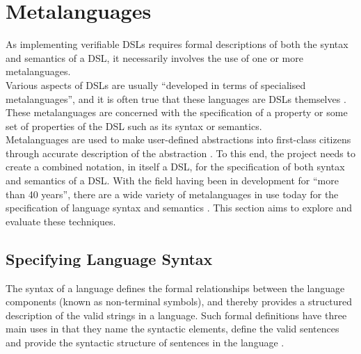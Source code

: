 \section{Metalanguages} %
\label{sec:metalanguages}

As implementing verifiable DSLs requires formal descriptions of both the syntax and semantics of a DSL, it necessarily involves the use of one or more metalanguages. \\

Various aspects of DSLs are usually ``developed in terms of specialised metalanguages'', and it is often true that these languages are DSLs themselves \citep{Mernik:2005:DDL:1118890.1118892}.
These metalanguages are concerned with the specification of a property or some set of properties of the DSL such as its syntax or semantics. \\

Metalanguages are used to make user-defined abstractions into first-class citizens through accurate description of the abstraction \citep{Siek:2010:GPL:1706356.1706358}.
To this end, the project needs to create a combined notation, in itself a DSL, for the specification of both syntax and semantics of a DSL. 
With the field having been in development for ``more than 40 years'', there are a wide variety of metalanguages in use today for the specification of language syntax and semantics \citep{Zhang:2004:SSD:981009.981013}. 
This section aims to explore and evaluate these techniques. 

\subsection{Specifying Language Syntax} %
\label{sub:specifying_language_syntax}
The syntax of a language defines the formal relationships between the language components (known as non-terminal symbols), and thereby provides a structured description of the valid strings in a language. 
Such formal definitions have three main uses in that they name the syntactic elements, define the valid sentences and provide the syntactic structure of sentences in the language \citep{Scowen:1982:SSM:947912.947917,standard1996ebnf}.



